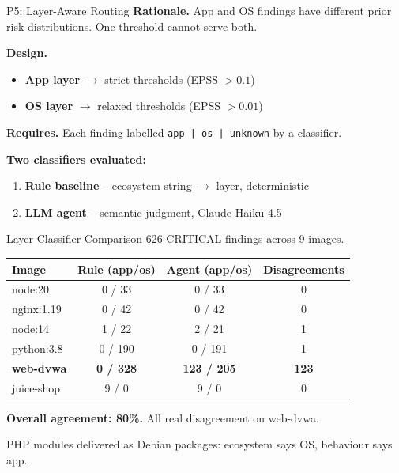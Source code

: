 \documentclass[aspectratio=169]{beamer}
\begin{document}
\begin{frame}{P5: Layer-Aware Routing}
\textbf{Rationale.} App and OS findings have different prior risk distributions. One threshold cannot serve both.

\medskip
\textbf{Design.}
\begin{itemize}
  \item \textbf{App layer} $\rightarrow$ strict thresholds (EPSS $> 0.1$)
  \item \textbf{OS layer} $\rightarrow$ relaxed thresholds (EPSS $> 0.01$)
\end{itemize}

\medskip
\textbf{Requires.} Each finding labelled \texttt{app | os | unknown} by a classifier.

\medskip
\textbf{Two classifiers evaluated:}
\begin{enumerate}
  \item \textbf{Rule baseline} -- ecosystem string $\to$ layer, deterministic
  \item \textbf{LLM agent} -- semantic judgment, Claude Haiku 4.5
\end{enumerate}
\end{frame}

\begin{frame}{Layer Classifier Comparison}
626 CRITICAL findings across 9 images.

\medskip
\small
\begin{tabular}{lccc}
\toprule
Image & Rule (app/os) & Agent (app/os) & Disagreements \\
\midrule
node:20 & 0 / 33 & 0 / 33 & 0 \\
nginx:1.19 & 0 / 42 & 0 / 42 & 0 \\
node:14 & 1 / 22 & 2 / 21 & 1 \\
python:3.8 & 0 / 190 & 0 / 191 & 1 \\
\textbf{web-dvwa} & \textbf{0 / 328} & \textbf{123 / 205} & \textbf{123} \\
juice-shop & 9 / 0 & 9 / 0 & 0 \\
\bottomrule
\end{tabular}

\medskip
\textbf{Overall agreement: 80\%.} All real disagreement on web-dvwa.

PHP modules delivered as Debian packages: ecosystem says OS, behaviour says app.
\end{frame}
\end{document}
